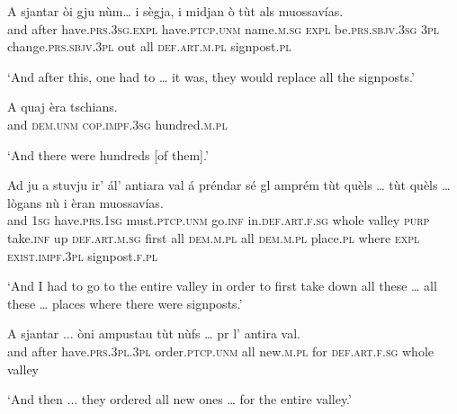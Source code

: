 \begin{linenumbers}
\gll A sjantar òi gju nùm… i sègja, i midjan ò tùt als muossavías.\\
and after have.\textsc{prs.3sg.expl} have.\textsc{ptcp.unm} name.\textsc{m.sg} \textsc{expl} be.\textsc{prs.sbjv.3sg}  \textsc{3pl} change.\textsc{prs.sbjv.3pl} out all \textsc{def.art.m.pl} signpost.\textsc{pl}\\
\end{linenumbers}
\medskip
\glt `And after this, one had to … it was, they would replace all the signposts.'
\medskip

\begin{linenumbers}
\gll  A quaj èra tschians.   \\
and \textsc{dem.unm} \textsc{cop.impf.3sg} hundred.\textsc{m.pl}\\
\end{linenumbers}
\medskip
\glt `And there were hundreds [of them].'
\medskip

\begin{linenumbers}
\gll Ad ju a stuvju ir’ ál’ antiara val á préndar sé gl amprém tùt quèls … tùt quèls … lògans nù i èran muossavías.\\
and \textsc{1sg} have.\textsc{prs.1sg} must.\textsc{ptcp.unm} go.\textsc{inf} in.\textsc{def.art.f.sg} whole valley \textsc{purp} take.\textsc{inf} up \textsc{def.art.m.sg} first all \textsc{dem.m.pl} {} all \textsc{dem.m.pl} {} place.\textsc{pl} where \textsc{expl} \textsc{exist.impf.3pl} signpost.\textsc{f.pl}\\
\end{linenumbers}
\medskip
\glt `And I had to go to the entire valley in order to first take down all these … all these … places where there were signposts.'
\medskip

\begin{linenumbers}
\gll  A sjantar ... òni ampustau tùt nùfs … pr l’ antira val.  \\
and after {} have.\textsc{prs.3pl.3pl} order.\textsc{ptcp.unm} all new.\textsc{m.pl} {} for \textsc{def.art.f.sg} whole valley \\
\end{linenumbers}
\medskip
\glt `And then ... they ordered all new ones … for the entire valley.'
\medskip

